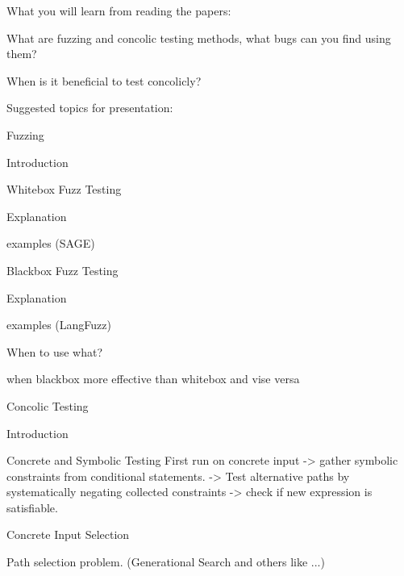 What you will learn from reading the papers:
\begin{list}
    \item What are fuzzing and concolic testing methods, what bugs can you find using them?
    \item When is it beneficial to test concolicly?
\end{list}

Suggested topics for presentation:
\begin{list}
    \item Fuzzing
          \begin{list}
              \item Introduction
              \item Whitebox Fuzz Testing
                    \item Explanation
                    \item examples (SAGE)
              \item Blackbox Fuzz Testing
                    \item Explanation
                    \item examples (LangFuzz)
              \item When to use what?
                    \item when blackbox more effective than whitebox and vise versa
          \end{list}
    
    \item Concolic Testing
          \begin{list}
              \item Introduction
              \item Concrete and Symbolic Testing
              First run on concrete input -> gather symbolic constraints from conditional statements. -> Test alternative paths by systematically negating collected constraints -> check if new expression is satisfiable.
              
                    \begin{list}
                        \item Concrete Input Selection
                        \item Path selection problem. (Generational Search and others like ...)
                    \end{list}
              
          \end{list}
\end{list}